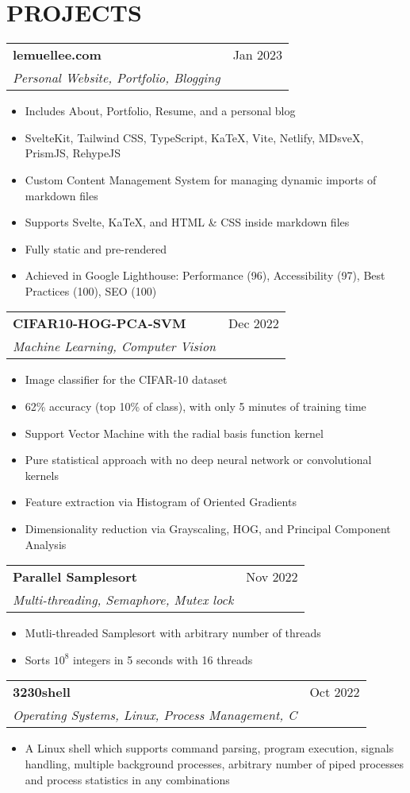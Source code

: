 \documentclass{article}
\newcommand{\jobTitle}[3]{
\vspace{0.4cm}
\begin{tabularx}{0.99\linewidth}{ X r }
    \textbf{#1} & #2\\
    \textit{#3} &
\end{tabularx}
\vspace{0.2cm}
}
\newenvironment{descitemize}
{ \begin{itemize}[leftmargin=1.4cm,,topsep=0pt]
    \setlength{\parskip}{0pt}
    \setlength{\parsep}{0pt}     }
{ \end{itemize}                  }
\begin{document}
\section{PROJECTS}

\jobTitle
{lemuellee.com}
{Jan 2023}
{Personal Website, Portfolio, Blogging}
\begin{descitemize}
    \item Includes About, Portfolio, Resume, and a personal blog
    \item SvelteKit, Tailwind CSS, TypeScript, KaTeX, Vite, Netlify, MDsveX, PrismJS, RehypeJS
    \item Custom Content Management System for managing dynamic imports of markdown files
	\item Supports Svelte, KaTeX, and HTML \& CSS inside markdown files
	\item Fully static and pre-rendered
	\item Achieved in Google Lighthouse: Performance (96), Accessibility (97), Best Practices (100), SEO (100)
\end{descitemize}

\jobTitle
{CIFAR10-HOG-PCA-SVM}
{Dec 2022}
{Machine Learning, Computer Vision}
\begin{descitemize}
    \item Image classifier for the CIFAR-10 dataset
    \item 62\% accuracy (top 10\% of class), with only 5 minutes of training time
    \item Support Vector Machine with the radial basis function kernel
    \item Pure statistical approach with no deep neural network or convolutional kernels
    \item Feature extraction via Histogram of Oriented Gradients
    \item Dimensionality reduction via Grayscaling, HOG, and Principal Component Analysis
\end{descitemize}

\jobTitle
{Parallel Samplesort}
{Nov 2022}
{Multi-threading, Semaphore, Mutex lock}
\begin{descitemize}
    \item Mutli-threaded Samplesort with arbitrary number of threads
    \item Sorts $10^8$ integers in 5 seconds with 16 threads
\end{descitemize}

\jobTitle
{3230shell}
{Oct 2022}
{Operating Systems, Linux, Process Management, C}
\begin{descitemize}
    \item A Linux shell which supports command parsing, program execution, signals handling, multiple background processes, arbitrary number of piped processes and process statistics in any combinations
\end{descitemize}
\end{document}
